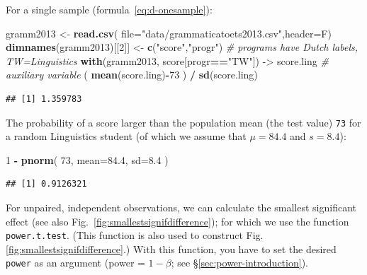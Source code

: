 \documentclass[
]{book}
\newenvironment{Shaded}{\begin{snugshade}}{\end{snugshade}}
\newcommand{\AttributeTok}[1]{\textcolor[rgb]{0.13,0.29,0.53}{#1}}
\newcommand{\CommentTok}[1]{\textcolor[rgb]{0.56,0.35,0.01}{\textit{#1}}}
\newcommand{\DecValTok}[1]{\textcolor[rgb]{0.00,0.00,0.81}{#1}}
\newcommand{\FloatTok}[1]{\textcolor[rgb]{0.00,0.00,0.81}{#1}}
\newcommand{\FunctionTok}[1]{\textcolor[rgb]{0.13,0.29,0.53}{\textbf{#1}}}
\newcommand{\NormalTok}[1]{#1}
\newcommand{\OtherTok}[1]{\textcolor[rgb]{0.56,0.35,0.01}{#1}}
\newcommand{\SpecialCharTok}[1]{\textcolor[rgb]{0.81,0.36,0.00}{\textbf{#1}}}
\newcommand{\StringTok}[1]{\textcolor[rgb]{0.31,0.60,0.02}{#1}}
\begin{document}
For a single sample
(formula~\eqref{eq:d-onesample}):\\

\begin{Shaded}
\begin{Highlighting}[]
\NormalTok{gramm2013 }\OtherTok{\textless{}{-}} \FunctionTok{read.csv}\NormalTok{( }\AttributeTok{file=}\StringTok{"data/grammaticatoets2013.csv"}\NormalTok{,}\AttributeTok{header=}\NormalTok{F)}
\FunctionTok{dimnames}\NormalTok{(gramm2013)[[}\DecValTok{2}\NormalTok{]] }\OtherTok{\textless{}{-}} \FunctionTok{c}\NormalTok{(}\StringTok{"score"}\NormalTok{,}\StringTok{"progr"}\NormalTok{)}
\CommentTok{\# programs have Dutch labels, TW=Linguistics}
\FunctionTok{with}\NormalTok{(gramm2013, score[progr}\SpecialCharTok{==}\StringTok{"TW"}\NormalTok{]) }\OtherTok{{-}\textgreater{}}\NormalTok{ score.ling}
\CommentTok{\# auxiliary variable}
\NormalTok{( }\FunctionTok{mean}\NormalTok{(score.ling)}\SpecialCharTok{{-}}\DecValTok{73}\NormalTok{ ) }\SpecialCharTok{/} \FunctionTok{sd}\NormalTok{(score.ling) }
\end{Highlighting}
\end{Shaded}

\begin{verbatim}
## [1] 1.359783
\end{verbatim}

The probability of a score larger than the population mean (the test value) \texttt{73} for a random Linguistics
student (of which we assume that \(\mu=84.4\) and \(s=8.4\)):

\begin{Shaded}
\begin{Highlighting}[]
\DecValTok{1} \SpecialCharTok{{-}} \FunctionTok{pnorm}\NormalTok{( }\DecValTok{73}\NormalTok{, }\AttributeTok{mean=}\FloatTok{84.4}\NormalTok{, }\AttributeTok{sd=}\FloatTok{8.4}\NormalTok{ ) }
\end{Highlighting}
\end{Shaded}

\begin{verbatim}
## [1] 0.9126321
\end{verbatim}

For unpaired, independent observations, we can calculate the smallest
significant effect (see also
Fig.~\ref{fig:smallestsignifdifference}); for which we use the function
\texttt{power.t.test}. (This function is
also used to construct Fig.\ref{fig:smallestsignifdifference}.)
With this function, you have to set the desired \texttt{power} as
an argument (power = \(1-\beta\); see
§\ref{sec:power-introduction}).
\end{document}
